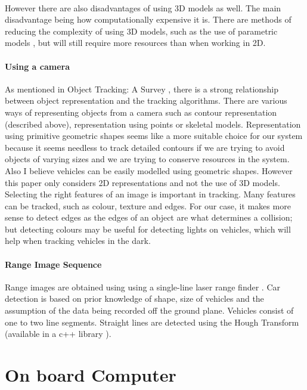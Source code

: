 \documentclass[a4paper]{report}
\begin{document}
{\paragraph{}However there are also disadvantages of using 3D models as well. The main disadvantage being how computationally expensive it is. There are methods of reducing the complexity of using 3D models, such as the use of parametric models \citep{kollnig19973d}, but will still require more resources than when working in 2D.

\paragraph{Using a camera}As mentioned in Object Tracking: A Survey \citep{object_tracking_a_survey}, there is a strong relationship between object representation and the tracking algorithms. There are various ways of representing objects from a camera such as contour representation (described above), representation using points or skeletal models. Representation using primitive geometric shapes seems like a more suitable choice for our system because it seems needless to track detailed contours if we are trying to avoid objects of varying sizes and we are trying to conserve resources in the system. Also I believe vehicles can be easily modelled using geometric shapes. However this paper only considers 2D representations and not the use of 3D models. Selecting the right features of an image is important in tracking. Many features can be tracked, such as colour, texture and edges. For our case, it makes more sense to detect edges as the edges of an object are what determines a collision; but detecting colours may be useful for detecting lights on vehicles, which will help when tracking vehicles in the dark. 

\paragraph{Range Image Sequence} Range images are obtained using using a single-line laser range finder \citep{qualitative_car_tracking}. Car detection is based on prior knowledge of shape, size of vehicles and the assumption of the data being recorded off the ground plane. Vehicles consist of one to two line segments. Straight lines are detected using the Hough Transform (available in a c++ library \cite{cpp_houghTransform}).

\section{On board Computer}
\label{sec:computer}

}
\end{document}
